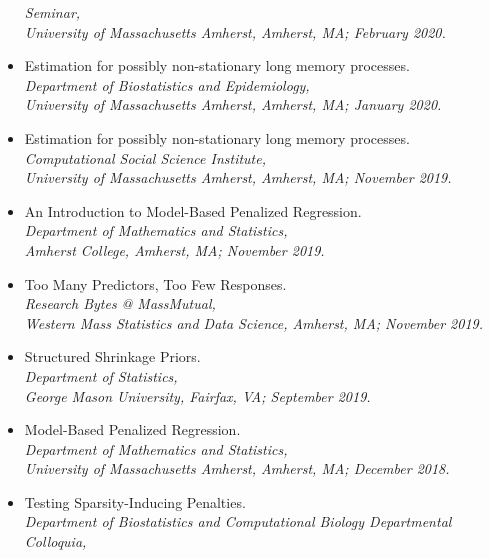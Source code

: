 \documentclass[11pt]{article}
\newcommand{\tab}{\hspace*{2em}}
\begin{document}
\begin{itemize}
	\tab \emph{Seminar,}\\ 
	\tab \emph{University of Massachusetts Amherst, Amherst, MA; February 2020.} \vspace{-2mm}
	\item[] Estimation for possibly non-stationary long memory processes. \\
	\tab \emph{Department of Biostatistics and Epidemiology,}\\ 
	\tab \emph{University of Massachusetts Amherst, Amherst, MA; January 2020.} \vspace{-2mm}
	\item[] Estimation for possibly non-stationary long memory processes. \\
	\tab \emph{Computational Social Science Institute,}\\ 
	\tab \emph{University of Massachusetts Amherst, Amherst, MA; November 2019.} \vspace{-2mm}
	\item[] An Introduction to Model-Based Penalized Regression. \\
	\tab \emph{Department of Mathematics and Statistics,}\\ 
	\tab \emph{Amherst College, Amherst, MA; November 2019.} \vspace{-2mm}
	\item[] Too Many Predictors, Too Few Responses. \\
	\tab \emph{Research Bytes @ MassMutual,}\\ 
	\tab \emph{Western Mass Statistics and Data Science, Amherst, MA; November 2019.} \vspace{-2mm}
	\item[] Structured Shrinkage Priors. \\
	\tab \emph{Department of Statistics,}\\ 
	\tab \emph{George Mason University, Fairfax, VA; September 2019.} \vspace{-2mm}
	\item[] Model-Based Penalized Regression. \\
	\tab \emph{Department of Mathematics and Statistics,}\\ 
	\tab \emph{University of Massachusetts Amherst, Amherst, MA; December 2018.} \vspace{-2mm}
	\item[] Testing Sparsity-Inducing Penalties. \\
	\tab \emph{Department of Biostatistics and Computational Biology Departmental Colloquia,}\\ 

\end{itemize}
\end{document}
